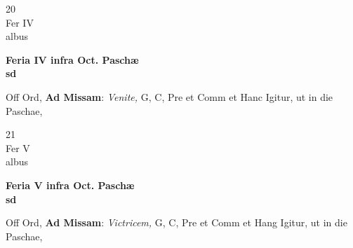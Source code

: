 \documentclass[10pt, openany]{book}
\begin{document}
        \begin{center}
            \begin{minipage}{3.5in}
                \vspace{2em}
                \begin{minipage}{0.5in}
                    {\Huge 20} \\
                    {\normalsize Fer IV} \\
                    {\normalsize albus}
                \end{minipage}
                \begin{minipage}{3.0in}
                    \textbf{ \large Feria IV infra Oct. Paschæ \\
                    \textnormal{\normalsize sd}} \\ 
                \end{minipage}
                \begin{justify}Off Ord, \textbf{Ad Missam}: \textit{Venite,} G, C, Pre et Comm et Hanc Igitur, ut in die Paschae,   
                \end{justify}
            \end{minipage}
        \end{center}
    
        \begin{center}
            \begin{minipage}{3.5in}
                \vspace{2em}
                \begin{minipage}{0.5in}
                    {\Huge 21} \\
                    {\normalsize Fer V} \\
                    {\normalsize albus}
                \end{minipage}
                \begin{minipage}{3.0in}
                    \textbf{ \large Feria V infra Oct. Paschæ \\
                    \textnormal{\normalsize sd}} \\ 
                \end{minipage}
                \begin{justify}Off Ord, \textbf{Ad Missam}: \textit{Victricem,} G, C, Pre et Comm et Hang Igitur, ut in die Paschae,   
                \end{justify}
            \end{minipage}
        \end{center}
    
\end{document}
